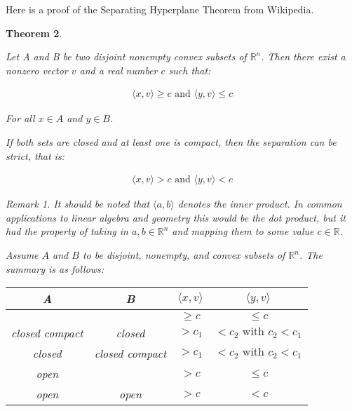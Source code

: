 \documentclass[11pt]{amsart}
\newcommand{\bracket}[1]{\langle #1 \rangle}
\newtheorem{thm}{Theorem}%
\theoremstyle{remark}
\newtheorem{rem}[thm]{Remark}
\theoremstyle{definition}
\begin{document}
Here is a proof of the Separating Hyperplane Theorem from
Wikipedia.

\begin{thm}
    \begin{mdframed}
        Let A and B be two disjoint nonempty convex subsets
        of $\mathbb{R}^n$. Then there exist a nonzero vector
        $v$ and a real number $c$ such that:

        \begin{gather}
            \bracket{x, v} \ge c \text{ and } \bracket{y, v} \le c
        \end{gather}

        For all $x \in A$ and $y \in B$.

        If both sets are closed and at least one is compact,
        then the separation can be strict, that is:

        \begin{gather}
            \bracket{x, v} > c \text{ and } \bracket{y, v} < c
        \end{gather}

        \begin{mdframed}
            \begin{rem}
                It should be noted that $\bracket{a, b}$ denotes the
                inner product. In common applications to linear algebra
                and geometry this would be the dot product, but it
                had the property of taking in $a, b \in \mathbb{R}^n$
                and mapping them to some value $c \in \mathbb{R}$.
            \end{rem}
        \end{mdframed}
        \vspace{8pt}

        Assume $A$ and $B$ to be disjoint, nonempty, and convex subsets
        of $\mathbb{R}^n$. The summary is as follows:

        \begin{center}
            \begin{tabular}{|c|c|c|c|}
                \hline
                A & B & $\bracket{x, v}$ & $\bracket{y, v}$\\ 
                \hline
                  &   & $\ge c$ & $\le c$\\
                  \hline
                closed compact & closed & $>c_1$ & $< c_2 \text{ with } c_2 < c_1$\\
                \hline
                closed & closed compact & $> c_1$& $< c_2 \text{ with } c_2 < c_1$\\
                \hline
                open & & $>c$ & $\le c$\\
                \hline
                open & open & $>c$ & $<c$\\
                \hline
            \end{tabular}
        \end{center}


\end{mdframed}
\end{thm}
\end{document}
